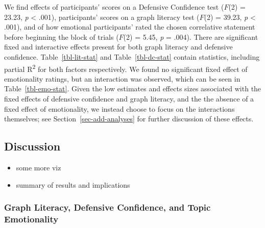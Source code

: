 \documentclass[manuscript,screen,review]{acmart}
\providecommand{\tightlist}{%
  \setlength{\itemsep}{0pt}\setlength{\parskip}{0pt}}\usepackage{longtable,booktabs,array}
\begin{document}
We find effects of participants' scores on a Defensive Confidence test
(\(F\)(2) = 23.23, \emph{p} \textless{} .001), participants' scores on a
graph literacy test \citep{garcia_2016} (\(F\)(2) = 39.23, \emph{p}
\textless{} .001), and of how emotional participants' rated the chosen
correlative statement before beginning the block of trials (\(F\)(2) =
5.45, \emph{p} = .004). There are significant fixed and interactive
effects present for both graph literacy and defensive confidence.
Table~\ref{tbl-lit-stat} and Table~\ref{tbl-dc-stat} contain statistics,
including partial R\textsuperscript{2} for both factors respectively. We
found no significant fixed effect of emotionality ratings, but an
interaction was observed, which can be seen in Table~\ref{tbl-emo-stat}.
Given the low estimates and effects sizes associated with the fixed
effects of defensive confidence and graph literacy, and the the absence
of a fixed effect of emotionality, we instead choose to focus on the
interactions themselves; see Section~\ref{sec-add-analyses} for further
discussion of these effects.

\subsection{Discussion}\label{sec-main-discussion}

\begin{itemize}
\tightlist
\item
  some more viz
\item
  summary of results and implications
\end{itemize}

\subsubsection{Graph Literacy, Defensive Confidence, and Topic
Emotionality}\label{sec-add-analyses-discussion}
\end{document}

